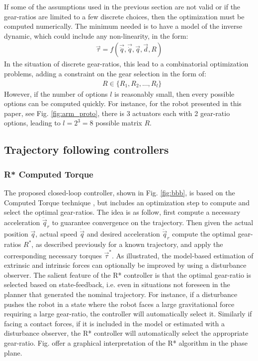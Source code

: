 If some of the assumptions used in the previous section are not valid or if the gear-ratios are limited to a few discrete choices, then the optimization must be computed numerically. The minimum needed is to have a model of the inverse dynamic, which could include any non-linearity, in the form:
\begin{align}
	\vec{\tau}  = f( \vec{\ddot{q}} , \vec{\dot{q}} , \vec{q} , \vec{d} , R ) 
\end{align}
In the situation of discrete gear-ratios, this lead to a combinatorial optimization problems, adding a constraint on the gear selection in the form of:
\begin{align}
	&  R \in \{R_1,R_2, ... , R_l\} 
\end{align}
However, if the number of options $l$ is reasonably small, then every possible options can be computed quickly. For instance, for the robot presented in this paper, see Fig. \ref{fig:arm_proto}, there is 3 actuators each with 2 gear-ratio options, leading to $l=2^3=8$ possible matrix $R$.



\subsection{Trajectory following controllers}

\subsubsection{R* Computed Torque}
\label{sec:RobustTrajectoryFollowingController}


The proposed closed-loop controller, shown in Fig. \ref{fig:bbb}, is based on the Computed Torque technique \cite{asada_robot_1986}, but includes an optimization step to compute and select the optimal gear-ratios. The idea is as follow, first compute a necessary acceleration $\ddot{\vec{q}}_r$ to guarantee convergence on the trajectory. Then given the actual position $\vec{q}$, actual speed $\dot{\vec{q}}$ and desired acceleration $\ddot{\vec{q}}_r$ compute the optimal gear-ratios $R^*$, as described previously for a known trajectory, and apply the corresponding necessary torques $\vec{\tau}^*$. As illustrated, the model-based estimation of extrinsic and intrinsic forces can optionally be improved by using a disturbance observer. The salient feature of the R* controller is that the optimal gear-ratio is selected based on state-feedback, i.e. even in situations not foreseen in the planner that generated the nominal trajectory. For instance, if a disturbance pushes the robot in a state where the robot faces a large gravitational force requiring a large gear-ratio, the controller will automatically select it. Similarly if facing a contact forces, if it is included in the model or estimated with a disturbance observer, the R* controller will automatically select the appropriate gear-ratio. Fig. \pageref{fig:dq} offer a graphical interpretation of the R* algorithm in the phase plane. 

